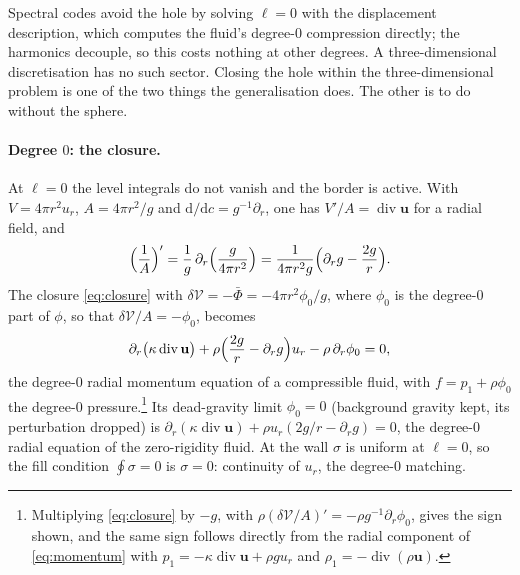 \documentclass[11pt]{article}
\theoremstyle{definition}
\theoremstyle{remark}
\newcommand{\bu}{\mathbf{u}}
\newcommand{\Div}{\operatorname{div}}
\newcommand{\Vol}{\mathcal V}
\begin{document}
Spectral codes avoid the hole by solving $\ell = 0$ with the
displacement description, which computes the fluid's degree-0
compression directly; the harmonics decouple, so this costs nothing at
other degrees. A three-dimensional discretisation has no such sector.
Closing the hole within the three-dimensional problem is one of the two
things the generalisation does. The other is to do without the sphere.

\paragraph{Degree $0$: the closure.} At $\ell = 0$ the level integrals
do not vanish and the border is active. With $V = 4\pi r^2u_r$, $A =
4\pi r^2/g$ and $\mathrm d/\mathrm dc = g^{-1}\partial_r$, one has $V'/A
= \Div\bu$ for a radial field, and
\begin{equation*}
  \Bigl(\frac1A\Bigr)' = \frac1g\,\partial_r\Bigl(\frac{g}{4\pi r^2}\Bigr)
  = \frac{1}{4\pi r^2g}\Bigl(\partial_rg - \frac{2g}{r}\Bigr) .
\end{equation*}
The closure \eqref{eq:closure} with $\delta\Vol = -\bar\Phi = -4\pi
r^2\phi_0/g$, where $\phi_0$ is the degree-0 part of $\phi$, so that
$\delta\Vol/A = -\phi_0$, becomes
\begin{equation}
  \partial_r\bigl(\kappa\Div\bu\bigr)
  + \rho\Bigl(\frac{2g}{r} - \partial_rg\Bigr)u_r
  - \rho\,\partial_r\phi_0 = 0 ,
  \label{eq:deg0}
\end{equation}
the degree-0 radial momentum equation of a compressible fluid, with $f
= p_1 + \rho\phi_0$ the degree-0 pressure.\footnote{Multiplying
\eqref{eq:closure} by $-g$, with $\rho(\delta\Vol/A)' =
-\rho g^{-1}\partial_r\phi_0$, gives the sign shown, and the same sign
follows directly from the radial component of \eqref{eq:momentum} with
$p_1 = -\kappa\Div\bu + \rho g u_r$ and $\rho_1 = -\Div(\rho\bu)$.} Its
dead-gravity limit $\phi_0 = 0$ (background gravity kept, its
perturbation dropped) is $\partial_r(\kappa\Div\bu) + \rho u_r(2g/r -
\partial_rg) = 0$, the degree-0 radial equation of the zero-rigidity
fluid. At the wall $\sigma$ is uniform at $\ell = 0$, so the fill
condition $\oint\sigma = 0$ is $\sigma = 0$: continuity of $u_r$, the
degree-0 matching.
\end{document}
